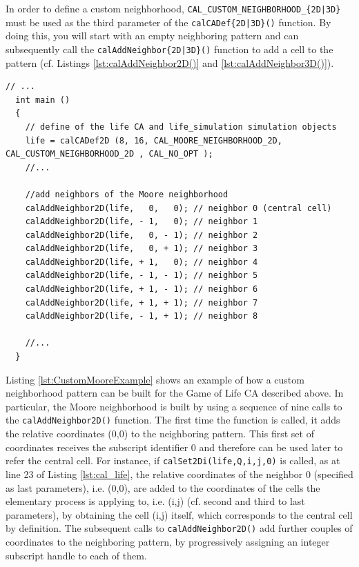 In order to define a custom neighborhood,
\verb'CAL_CUSTOM_NEIGHBORHOOD_{2D|3D}' must be used as the third
parameter of the \verb'calCADef{2D|3D}()' function. By doing this, you
will start with an empty neighboring pattern and can subsequently call
the \verb'calAddNeighbor{2D|3D}()' function to add a cell to the
pattern (cf. Listings \ref{lst:calAddNeighbor2D()} and
\ref{lst:calAddNeighbor3D()}).

\begin{lstlisting}[float, label=lst:CustomMooreExample, caption=Example of custom neighbourhood pattern; the sequence of calls to the calAddNeighbor2D() function defines the Moore neighbourhood for the Game of Life CA., numbers=none]
  // ...
  int main ()
  {
    // define of the life CA and life_simulation simulation objects
    life = calCADef2D (8, 16, CAL_MOORE_NEIGHBORHOOD_2D, CAL_CUSTOM_NEIGHBORHOOD_2D , CAL_NO_OPT );
    //...

    //add neighbors of the Moore neighborhood
    calAddNeighbor2D(life,   0,   0); // neighbor 0 (central cell)
    calAddNeighbor2D(life, - 1,   0); // neighbor 1
    calAddNeighbor2D(life,   0, - 1); // neighbor 2
    calAddNeighbor2D(life,   0, + 1); // neighbor 3
    calAddNeighbor2D(life, + 1,   0); // neighbor 4
    calAddNeighbor2D(life, - 1, - 1); // neighbor 5
    calAddNeighbor2D(life, + 1, - 1); // neighbor 6
    calAddNeighbor2D(life, + 1, + 1); // neighbor 7
    calAddNeighbor2D(life, - 1, + 1); // neighbor 8

    //...
  }
\end{lstlisting}

Listing \ref{lst:CustomMooreExample} shows an example of how a custom
neighborhood pattern can be built for the Game of Life CA described
above. In particular, the Moore neighborhood is built by using a
sequence of nine calls to the \verb'calAddNeighbor2D()' function. The
first time the function is called, it adds the relative coordinates
(0,0) to the neighboring pattern. This first set of coordinates
receives the subscript identifier 0 and therefore can be used later to
refer the central cell. For instance, if
\verb'calSet2Di(life,Q,i,j,0)' is called, as at line 23 of Listing
\ref{lst:cal_life}, the relative coordinates of the neighbor 0
(specified as last parameters), i.e. (0,0), are added to the
coordinates of the cells the elementary process is applying to,
i.e. (i,j) (cf. second and third to last parameters), by obtaining the
cell (i,j) itself, which corresponds to the central cell by
definition. The subsequent calls to \verb'calAddNeighbor2D()' add
further couples of coordinates to the neighboring pattern, by
progressively assigning an integer subscript handle to each of
them.


